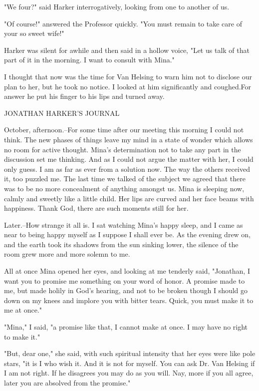 "We four?" said Harker interrogatively, looking from one to another of us. 

"Of course!" answered the Professor quickly. "You must remain to take care of your so sweet wife!" 

Harker was silent for awhile and then said in a hollow voice, "Let us talk of that part of it in the morning. I want to consult with Mina." 

I thought that now was the time for Van Helsing to warn him not to disclose our plan to her, but he took no notice. I looked at him significantly and coughed.For answer he put his finger to his lips and turned away. 

JONATHAN HARKER'S JOURNAL 

October, afternoon.--For some time after our meeting this morning I could not think. The new phases of things leave my mind in a state of wonder which allows no room for active thought. Mina's determination not to take any part in the discussion set me thinking. And as I could not argue the matter with her, I could only guess. I am as far as ever from a solution now. The way the others received it, too puzzled me. The last time we talked of the subject we agreed that there was to be no more concealment of anything amongst us. Mina is sleeping now, calmly and sweetly like a little child. Her lips are curved and her face beams with happiness. Thank God, there are such moments still for her. 

Later.--How strange it all is. I sat watching Mina's happy sleep, and I came as near to being happy myself as I suppose I shall ever be. As the evening drew on, and the earth took its shadows from the sun sinking lower, the silence of the room grew more and more solemn to me. 

All at once Mina opened her eyes, and looking at me tenderly said, "Jonathan, I want you to promise me something on your word of honor. A promise made to me, but made holily in God's hearing, and not to be broken though I should go down on my knees and implore you with bitter tears. Quick, you must make it to me at once." 

"Mina," I said, "a promise like that, I cannot make at once. I may have no right to make it." 

"But, dear one," she said, with such spiritual intensity that her eyes were like pole stars, "it is I who wish it. And it is not for myself. You can ask Dr. Van Helsing if I am not right. If he disagrees you may do as you will. Nay, more if you all agree, later you are absolved from the promise." 

